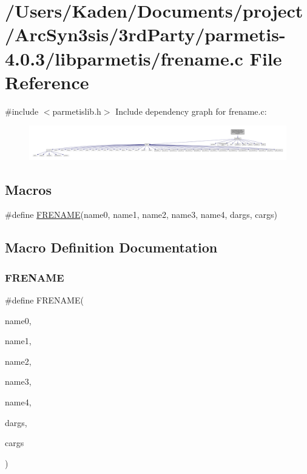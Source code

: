 \hypertarget{a00900}{}\section{/\+Users/\+Kaden/\+Documents/project/\+Arc\+Syn3sis/3rd\+Party/parmetis-\/4.0.3/libparmetis/frename.c File Reference}
\label{a00900}
{\ttfamily \#include $<$parmetislib.\+h$>$}\newline
Include dependency graph for frename.\+c\+:\nopagebreak
\begin{figure}[H]
\begin{center}
\leavevmode
\includegraphics[width=350pt]{a00901}
\end{center}
\end{figure}
\subsection*{Macros}
\begin{DoxyCompactItemize}
\item 
\#define \hyperlink{a00900_acca3bfcf3862d3b48791d39883dd0335}{F\+R\+E\+N\+A\+ME}(name0,  name1,  name2,  name3,  name4,  dargs,  cargs)
\end{DoxyCompactItemize}


\subsection{Macro Definition Documentation}
\mbox{\label{a00900_acca3bfcf3862d3b48791d39883dd0335}} 
\subsubsection{\texorpdfstring{F\+R\+E\+N\+A\+ME}{FRENAME}}
{\footnotesize\ttfamily \#define F\+R\+E\+N\+A\+ME(\begin{DoxyParamCaption}\item[{}]{name0,  }\item[{}]{name1,  }\item[{}]{name2,  }\item[{}]{name3,  }\item[{}]{name4,  }\item[{}]{dargs,  }\item[{}]{cargs }\end{DoxyParamCaption})}

